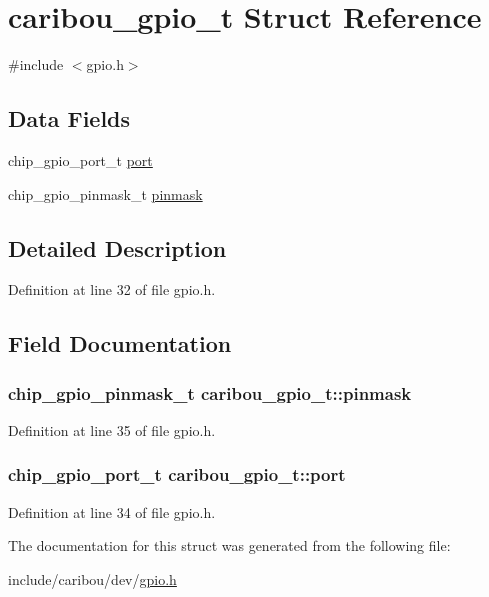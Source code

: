 \hypertarget{structcaribou__gpio__t}{\section{caribou\-\_\-gpio\-\_\-t Struct Reference}
\label{structcaribou__gpio__t}
}


{\ttfamily \#include $<$gpio.\-h$>$}

\subsection*{Data Fields}
\begin{DoxyCompactItemize}
\item 
chip\-\_\-gpio\-\_\-port\-\_\-t \hyperlink{structcaribou__gpio__t_ab474b09a256ab1cb97f704a5233f143b}{port}
\item 
chip\-\_\-gpio\-\_\-pinmask\-\_\-t \hyperlink{structcaribou__gpio__t_a176db98ba5783d4842ffd1b475d5bae2}{pinmask}
\end{DoxyCompactItemize}


\subsection{Detailed Description}


Definition at line 32 of file gpio.\-h.



\subsection{Field Documentation}
\hypertarget{structcaribou__gpio__t_a176db98ba5783d4842ffd1b475d5bae2}{
\subsubsection[{pinmask}]{\setlength{\rightskip}{0pt plus 5cm}chip\-\_\-gpio\-\_\-pinmask\-\_\-t caribou\-\_\-gpio\-\_\-t\-::pinmask}}\label{structcaribou__gpio__t_a176db98ba5783d4842ffd1b475d5bae2}


Definition at line 35 of file gpio.\-h.

\hypertarget{structcaribou__gpio__t_ab474b09a256ab1cb97f704a5233f143b}{
\subsubsection[{port}]{\setlength{\rightskip}{0pt plus 5cm}chip\-\_\-gpio\-\_\-port\-\_\-t caribou\-\_\-gpio\-\_\-t\-::port}}\label{structcaribou__gpio__t_ab474b09a256ab1cb97f704a5233f143b}


Definition at line 34 of file gpio.\-h.



The documentation for this struct was generated from the following file\-:\begin{DoxyCompactItemize}
\item 
include/caribou/dev/\hyperlink{gpio_8h}{gpio.\-h}\end{DoxyCompactItemize}
